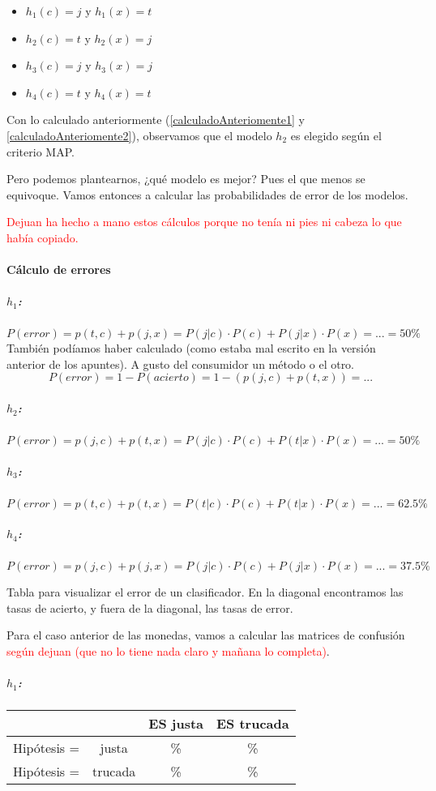 \documentclass{apuntes}
\begin{document}
\begin{example}
\begin{itemize}
	\item $h_1(c) = j$ y $h_1(x) = t$ 
	\item $h_2(c) = t$ y $h_2(x) = j$ 
	\item $h_3(c) = j$ y $h_3(x) = j$ 
	\item $h_4(c) = t$ y $h_4(x) = t$ 
\end{itemize}

Con lo calculado anteriormente (\ref{calculadoAnteriomente1} y \ref{calculadoAnteriomente2}), observamos que el modelo $h_2$ es elegido según el criterio MAP. 

Pero podemos plantearnos, ¿qué modelo es mejor? Pues el que menos se equivoque. Vamos entonces a calcular las probabilidades de error de los modelos.

\textcolor{red}{Dejuan ha hecho a mano estos cálculos porque no tenía ni pies ni cabeza lo que había copiado.}

\paragraph{Cálculo de errores}
\subparagraph{$h_1$:} $P(error) = p(t,c) + p(j,x) = P(j|c)·P(c) + P(j|x)·P(x) = ... = 50\% $
También podíamos haber calculado (como estaba mal escrito en la versión anterior de los apuntes). A gusto del consumidor un método o el otro.
\[P(error) = 1-P(acierto) = 1 - (p(j,c) + p(t,x)) = ...\]

\subparagraph{$h_2$:} 
$P(error) = p(j,c) + p(t,x) = P(j|c)·P(c) + P(t|x)·P(x) = ... = 50\%$
\subparagraph{$h_3$:} 
$P(error) = p(t,c) + p(t,x) = P(t|c)·P(c) + P(t|x)·P(x) = ... = 62.5\%$
\subparagraph{$h_4$:} 
$P(error) = p(j,c) + p(j,x) = P(j|c)·P(c) + P(j|x)·P(x) = ... = 37.5\%$
\end{example}


 \begin{defn}
 	Tabla para visualizar el error de un clasificador. En la diagonal encontramos las tasas de acierto, y fuera de la diagonal, las tasas de error.
 \end{defn}


Para el caso anterior de las monedas, vamos a calcular las matrices de confusión  \textcolor{red}{según dejuan (que no lo tiene nada claro y mañana lo completa)}.



\subparagraph{$h_1$:}
\begin{center}
\begin{tabular}{cc|cc}
 && ES justa & ES trucada \\\hline
 Hipótesis =& justa & \% & \%\\
 Hipótesis =& trucada & \% & \%
\end{tabular}
\end{center}
\end{document}
